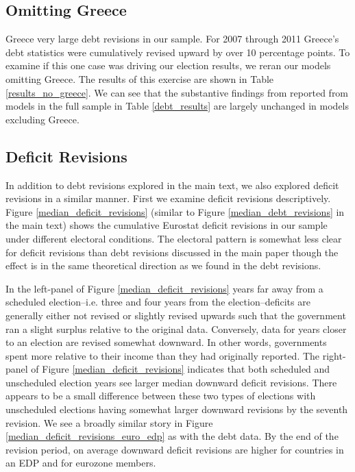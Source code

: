 \documentclass[]{article}
\begin{document}


\subsection*{Omitting Greece}

Greece very large debt revisions in our sample. For 2007 through 2011 Greece's debt statistics were cumulatively revised upward by over 10 percentage points. To examine if this one case was driving our election results, we reran our models omitting Greece. The results of this exercise are shown in Table \ref{results_no_greece}. We can see that the substantive findings from reported from models in the full sample in Table \ref{debt_results} are largely unchanged in models excluding Greece.

\begin{landscape}
    
\end{landscape}

\subsection*{Deficit Revisions}

In addition to debt revisions explored in the main text, we also explored deficit revisions in a similar manner. First we examine deficit revisions descriptively. Figure \ref{median_deficit_revisions} (similar to Figure \ref{median_debt_revisions} in the main text) shows the cumulative Eurostat deficit revisions in our sample under different electoral conditions. The electoral pattern is somewhat less clear for deficit revisions than debt revisions discussed in the main paper though the effect is in the same theoretical direction as we found in the debt revisions.

In the left-panel of Figure \ref{median_deficit_revisions} years far away from a scheduled election--i.e. three and four years from the election--deficits are generally either not revised or slightly revised upwards such that the government ran a slight surplus relative to the original data. Conversely, data for years closer to an election are revised somewhat downward. In other words, governments spent more relative to their income than they had originally reported. The right-panel of Figure \ref{median_deficit_revisions} indicates that both scheduled and unscheduled election years see larger median downward deficit revisions. There appears to be a small difference between these two types of elections with unscheduled elections having somewhat larger downward revisions by the seventh revision. We see a broadly similar story in Figure \ref{median_deficit_revisions_euro_edp} as with the debt data. By the end of the revision period, on average downward deficit revisions are higher for countries in an EDP and for eurozone members.
\end{document}
